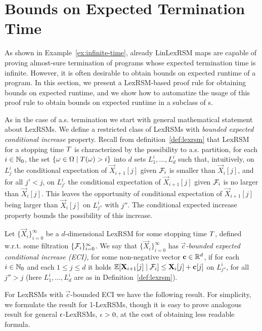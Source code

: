 \section{Bounds on Expected Termination Time}

As shown in Example~\ref{ex:infinite-time}, already LinLexRSM maps are capable 
of proving almost-sure termination of programs whose expected termination time 
is infinite. However, it is often desirable to obtain bounds on expected 
runtime of a program. In this section, we present a LexRSM-based proof rule for 
obtaining bounds on expected runtime, and we show how to automatize the usage 
of this proof rule to obtain bounds on expected runtime in a 
subclass of \PP{}s.

As in the case of a.s. termination we start with general mathematical statement 
about LexRSMs. We define a restricted class of LexRSMs with \emph{bounded 
expected conditional increase} property. Recall from 
definition~\ref{def:lexrsm} that 
LexRSM for a stopping time $T$ is characterized by the possibility to 
a.s. partition, for each $i\in \mathbb{N}_0$, the set $\{\omega\in \Omega\mid 
T(\omega)>i \}$ into $d$ sets $L^i_1,\dots,L^i_d$ such that, intuitively, 
on $L^i_j$ the conditional expectation of $\vec{X}_{i+1}[j]$ given $\mathcal{F}_i$ 
is smaller than $\vec{X}_i[j]$, and for all $j'<j$, on $L^i_{j'}$ the 
conditional expectation of $\vec{X}_{i+1}[j]$ given $\mathcal{F}_i$ 
is no larger than $\vec{X}_i[j]$. This leaves the opportunity of conditional 
expectation of $\vec{X}_{i+1}[j]$ being larger than $\vec{X}_i[j]$ on 
$L^i_{j''}$ with $j''$. The conditional expected increase property bounds the 
possibility of this increase.

\begin{definition}
Let $\{\vec{X}_{i}\}_{i=0}^{\infty}$ be a 
$d$-dimensional LexRSM for some stopping time $T$, defined w.r.t. some 
filtration $\{\mathcal{F}_i\}_{i=0}^{\infty}$. We say that 
$\{\vec{X}_{i}\}_{i=0}^{\infty}$ has \emph{$\vec{c}$-bounded expected 
conditional 
increase (ECI),} for 
some non-negative vector $\mathbf{c}\in\mathbb{R}^d$, if for each $i\in \mathbb{N}_0 $ and 
each $1\leq 
j \leq d $ it holds 
$\mathbb{E}[\mathbf{X}_{i+1}[j]\mid \mathcal{F}_i]\leq \mathbf{X}_{i}[j]+\mathbf{c}[j]$ on 
$L^i_{j''}$, 
for all $j''>j$ 
(here $L^i_1,\dots,L^i_d$ are as in Definition~\ref{def:lexrsm}).
\end{definition}

For LexRSMs with $\vec{c}$-bounded ECI we have the following result. For 
simplicity, 
we formulate the result for 1-LexRSMs, though it is easy to prove analogous 
result for general $\epsilon$-LexRSMs, $\epsilon>0$, at the cost of obtaining less 
readable formula.


